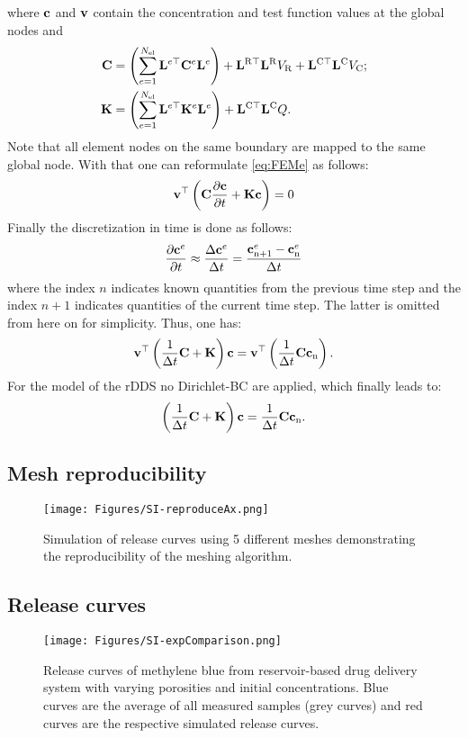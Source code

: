 \documentclass{article}
\begin{document}
  where ${\bf{c}}$ and ${\bf{v}}$ contain the concentration and test function values at the global nodes and
  \begin{align}
    {\bf{C}} &= \left(\sum_{e=1}^{N_{\rm el}} {{\bf{L}}}^{e \top} {\bf{C}}^e {\bf{L}}^{e}\right) + {\bf{L}}^{\rm R \top}{\bf{L}}^{\rm R}V_{\rm R} + {\bf{L}}^{\rm C \top}{\bf{L}}^{\rm C}V_{\rm C}; \\
    {\bf{K}} &= \left(\sum_{e=1}^{N_{\rm el}} {{\bf{L}}}^{e \top} {\bf{K}}^e {\bf{L}}^{e}\right) + {\bf{L}}^{\rm C \top}{\bf{L}}^{\rm C} Q.
  \end{align}
  Note that all element nodes on the same boundary are mapped to the same global node. With that one can reformulate \cref{eq:FEMe} as follows:
  \begin{equation}
    {\bf{v}}^{\top} \left({\bf{C}} \frac{\partial {\bf{c}}}{\partial t} + {\bf{K}} {\bf{c}} \right) = 0 \label{eq:FEM}
  \end{equation}
  Finally the discretization in time is done as follows:
  \begin{equation}
    \frac{\partial {\bf{c}}^e}{\partial t} \approx \frac{\Delta {\bf{c}}^e}{\Delta t}  = \frac{{\bf{c}}^e_{\rm n+1}-{\bf{c}}^e_{\rm n}}{\Delta t}
  \end{equation}
  where the index $n$ indicates known quantities from the previous time step and the index $n+1$ indicates quantities of the current time step. The latter is omitted from here on for simplicity.
  Thus, one has: 
  \begin{equation}
    {\bf{v}}^{\top} \left( \frac{1}{\Delta t}{\bf{C}}+ {\bf{K}} \right) {\bf{c}} = {\bf{v}}^{\top} \left(\frac{1}{\Delta t} {\bf{C}} {\bf{c}}_{\rm n}\right).
  \end{equation}
  For the model of the rDDS no Dirichlet-BC are applied, which finally leads to: 
  \begin{equation}
    \left( \frac{1}{\Delta t}{\bf{C}}+ {\bf{K}} \right) {\bf{c}} = \frac{1}{\Delta t}{\bf{C}} {\bf{c}}_{\rm n}.
  \end{equation} 

  \newpage
  \subsection*{Mesh reproducibility}
  \begin{figure}[h!]
    \texttt{[image: Figures/SI-reproduceAx.png]}
    \caption{Simulation of release curves using 5 different meshes demonstrating the reproducibility of the meshing algorithm.}
  \end{figure}

  \newpage
  \subsection*{Release curves}
  \begin{figure}[h!]
    \texttt{[image: Figures/SI-expComparison.png]}
    \caption{Release curves of methylene blue from reservoir-based drug delivery system with varying porosities and initial concentrations. Blue curves are the average of all measured samples (grey curves) and red curves are the respective simulated release curves. }
  \end{figure}
\end{document}
